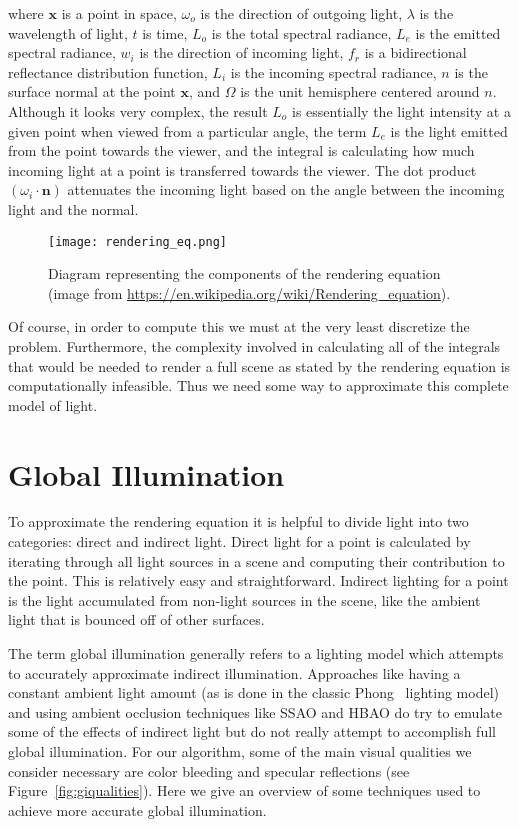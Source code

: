 where $\bm{x}$ is a point in space, $\omega_o$ is the direction of outgoing light, $\lambda$ is the wavelength of light, $t$ is time, $L_o$ is the total spectral radiance, $L_e$ is the emitted spectral radiance, $w_i$ is the direction of incoming light, $f_r$ is a bidirectional reflectance distribution function, $L_i$ is the incoming spectral radiance, $n$ is the surface normal at the point $\bm{x}$, and $\Omega$ is the unit hemisphere centered around $n$. Although it looks very complex, the result $L_o$ is essentially the light intensity at a given point when viewed from a particular angle, the term $L_e$ is the light emitted from the point towards the viewer, and the integral is calculating how much incoming light at a point is transferred towards the viewer. The dot product $(\omega_i \cdot \bm{n})$ attenuates the incoming light based on the angle between the incoming light and the normal.

\begin{figure}[h]
\centering
\texttt{[image: rendering\_eq.png]}
\caption{Diagram representing the components of the rendering equation (image from \url{https://en.wikipedia.org/wiki/Rendering\_equation}).}
\label{fig:renderingeq}
\end{figure}

Of course, in order to compute this we must at the very least discretize the problem. Furthermore, the complexity involved in calculating all of the integrals that would be needed to render a full scene as stated by the rendering equation is computationally infeasible. Thus we need some way to approximate this complete model of light.


\section{Global Illumination}
To approximate the rendering equation it is helpful to divide light into two categories: direct and indirect light. Direct light for a point is calculated by iterating through all light sources in a scene and computing their contribution to the point. This is relatively easy and straightforward. Indirect lighting for a point is the light accumulated from non-light sources in the scene, like the ambient light that is bounced off of other surfaces.

The term global illumination generally refers to a lighting model which attempts to accurately approximate indirect illumination. Approaches like having a constant ambient light amount (as is done in the classic Phong~\cite{phong1975illumination} lighting model) and using ambient occlusion techniques like SSAO and HBAO do try to emulate some of the effects of indirect light but do not really attempt to accomplish full global illumination. For our algorithm, some of the main visual qualities we consider necessary are color bleeding and specular reflections (see Figure~\ref{fig:giqualities}). Here we give an overview of some techniques used to achieve more accurate global illumination.

